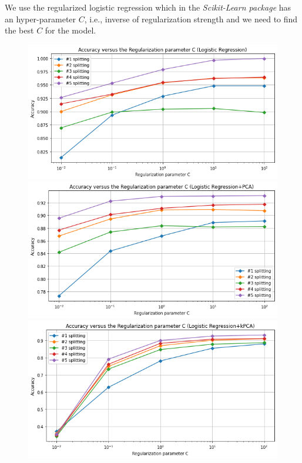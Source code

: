 \documentclass{article}
\begin{document}
We use the regularized logistic regression which in the \emph{Scikit-Learn package} has an hyper-parameter $C$, i.e., inverse of regularization strength and we need to find the best $C$ for the model.
\begin{figure}[!htb]
  \includegraphics[width=\linewidth]{figure/logit.png}
\endminipage\hfill
{}
  \includegraphics[width=\linewidth]{figure/logit_pca.png}
\endminipage\hfill
{}
  \includegraphics[width=\linewidth]{figure/logit_kpca.png}

\end{figure}
\end{document}
